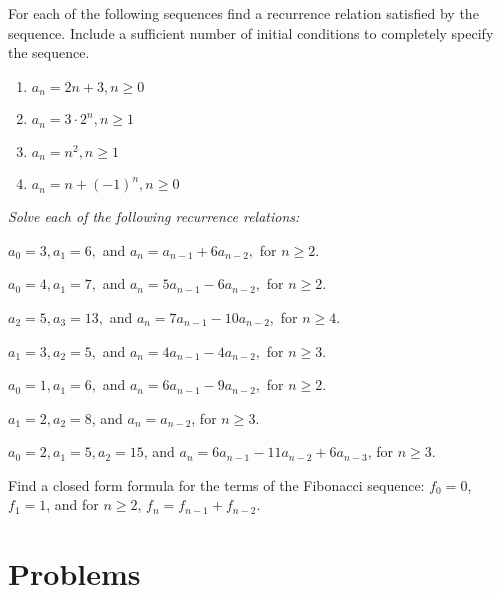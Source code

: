 \begin{exer}
For each of the following sequences find a recurrence relation satisfied by the sequence. Include a sufficient
number of initial conditions to completely specify the sequence.
\begin{enumerate}[label=(\alph*)]
 \item $a_n=2n+3, n\geq 0$
 \item $a_n=3\cdot 2^n, n\geq 1$
 \item $a_n=n^2, n\geq 1$
 \item $a_n=n+(-1)^n, n\geq 0$
\end{enumerate}
\end{exer}

\noindent\textit{Solve each of the following recurrence relations:}
\begin{exer}
$a_0=3, a_1=6,$ and $a_n=a_{n-1}+6a_{n-2},$ for $n\geq 2$.
\end{exer}

\begin{exer}
$a_0=4,a_1=7,$ and $a_n=5a_{n-1}-6a_{n-2},$ for $n\geq 2$.
\end{exer}

\begin{exer}
$a_2=5, a_3=13,$ and $a_n=7a_{n-1}-10a_{n-2},$ for $n\geq 4$.
\end{exer}

\begin{exer}
$a_1=3, a_2=5,$ and $a_n=4a_{n-1}-4a_{n-2},$ for $n\geq 3$.
\end{exer}

\begin{exer}
$a_0=1, a_1=6,$ and $a_n=6a_{n-1}-9a_{n-2},$ for $n\geq 2$.
\end{exer}

\begin{exer}
$a_1=2, a_2=8$, and $a_n=a_{n-2}$, for $n\geq 3$.
\end{exer}

\begin{exer}
$a_0=2, a_1=5, a_2 = 15$, and $a_n=6a_{n-1}-11a_{n-2}+6a_{n-3}$, for $n\geq 3$.
\end{exer}

\begin{exer}
Find a closed form formula for the terms of the Fibonacci sequence: $f_0=0$, $f_1=1$, and
for $n\geq 2$, $f_n=f_{n-1}+f_{n-2}$.
\end{exer}

\section{Problems}

